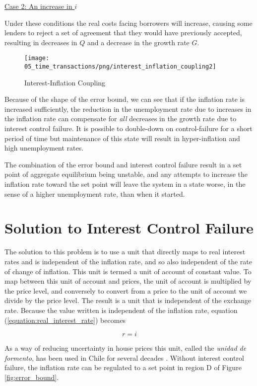 \underline{Case 2: An increase in $i$} 

Under these conditions the real costs facing borrowers will increase, causing some lenders to reject
a set of agreement that they would have previously accepted, resulting in decreases in $Q$ and a
decrease in the growth rate $G$.

\begin{figure}[H]
\centering
\texttt{[image: 05\_time\_transactions/png/interest\_inflation\_coupling2]}
\caption{Interest-Inflation Coupling}
\label{fig:interest_inflation_coupling2}
\end{figure}

Because of the shape of the error bound, we can see that if the inflation rate is increased
sufficiently, the reduction in the unemployment rate due to increases in the inflation rate can
compensate for \emph{all} decreases in the growth rate due to interest control failure. It is
possible to double-down on control-failure for a short period of time but maintenance of this state
will result in hyper-inflation and high unemployment rates.

The combination of the error bound and interest control failure result in a set point of aggregate
equilibrium being unstable, and any attempts to increase the inflation rate toward the set point
will leave the system in a state worse, in the sense of a higher unemployment rate, than when it
started.

\section{Solution to Interest Control Failure}

The solution to this problem is to use a unit that directly maps to real interest rates and is
independent of the inflation rate, and so also independent of the rate of change of inflation. This
unit is termed a unit of account of constant value. To map between this unit of account and prices,
the unit of account is multiplied by the price level, and conversely to convert from a price to the
unit of account we divide by the price level. The result is a unit that is independent of the
exchange rate. Because the value written is independent of the inflation rate, equation
(\ref{equation:real_interest_rate}) becomes

\[
    r = i
\]

As a way of reducing uncertainty in house prices this unit, called the \textit{unidad de formento},
has been used in Chile for several decades \cite{shiller1998}. Without interest control failure, the
inflation rate can be regulated to a set point in region D of Figure \ref{fig:error_bound}. 














